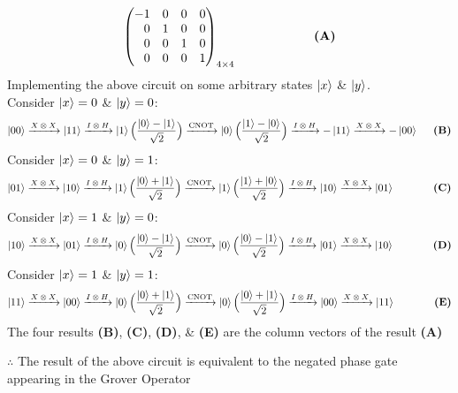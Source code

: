 \documentclass[a4paper,12pt]{article}
\begin{document}
\begin{enumerate}[label=(\alph*)]
\[\begin{pmatrix}
        -1 & 0 & 0 & 0 \\
        \phantom{-}0 & 1 & 0 & 0\\
        \phantom{-}0 & 0 & 1 & 0 \\
        \phantom{-}0 & 0 & 0 & 1\\
    \end{pmatrix}_{4 \times 4} \hspace{22mm} \textbf{(A)}\]
    Implementing the above circuit on some arbitrary states $\ket{x}$ \& $\ket{y}$. \\
    Consider $\ket{x} = 0 $ \& $\ket{y} = 0$: 
    \[\ket{00} \xrightarrow{\text{$X \otimes X$}}\ket{11} \xrightarrow{\text{$I \otimes H$}} \ket{1}\Big( \frac{\ket{0}-\ket{1}}{\sqrt{2}}\Big) \xrightarrow{\text{CNOT}}\ket{0}\Big(\frac{\ket{1}-\ket{0}}{\sqrt{2}}\Big)\xrightarrow{\text{$I \otimes H$}}-\ket{11} \xrightarrow{\text{$X \otimes X$}}-\ket{00} \hspace{5mm}\textbf{(B)}\]
    Consider $\ket{x} = 0 $ \& $\ket{y} = 1$: 
    \[\ket{01} \xrightarrow{\text{$X \otimes X$}}\ket{10} \xrightarrow{\text{$I \otimes H$}} \ket{1}\Big( \frac{\ket{0}+\ket{1}}{\sqrt{2}}\Big) \xrightarrow{\text{CNOT}}\ket{1}\Big(\frac{\ket{1}+\ket{0}}{\sqrt{2}}\Big)\xrightarrow{\text{$I \otimes H$}}\ket{10} \xrightarrow{\text{$X \otimes X$}}\ket{01}\hspace{13mm}\textbf{(C)}\]
    Consider $\ket{x} = 1 $ \& $\ket{y} = 0$: 
    \[\ket{10} \xrightarrow{\text{$X \otimes X$}}\ket{01} \xrightarrow{\text{$I \otimes H$}} \ket{0}\Big( \frac{\ket{0}-\ket{1}}{\sqrt{2}}\Big) \xrightarrow{\text{CNOT}}\ket{0}\Big(\frac{\ket{0}-\ket{1}}{\sqrt{2}}\Big)\xrightarrow{\text{$I \otimes H$}}\ket{01} \xrightarrow{\text{$X \otimes X$}}\ket{10}\hspace{13mm}\textbf{(D)}\]
    Consider $\ket{x} = 1 $ \& $\ket{y} = 1$: 
    \[\ket{11} \xrightarrow{\text{$X \otimes X$}}\ket{00} \xrightarrow{\text{$I \otimes H$}} \ket{0}\Big( \frac{\ket{0}+\ket{1}}{\sqrt{2}}\Big) \xrightarrow{\text{CNOT}}\ket{0}\Big(\frac{\ket{0}+\ket{1}}{\sqrt{2}}\Big)\xrightarrow{\text{$I \otimes H$}}\ket{00} \xrightarrow{\text{$X \otimes X$}}\ket{11}\hspace{13mm}\textbf{(E)}\]
    The four results \textbf{(B)}, \textbf{(C)}, \textbf{(D)}, \& \textbf{(E)} are the column vectors of the result \textbf{(A)} \\
    \begin{center}
        $\therefore$ The result of the above circuit is equivalent to the negated phase gate appearing in the Grover Operator
    \end{center}

\end{enumerate}
\end{document}
